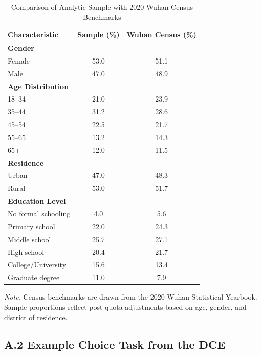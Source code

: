 \documentclass[12pt]{article}
\begin{document}
\begin{table}[H]
\centering
\caption{Comparison of Analytic Sample with 2020 Wuhan Census Benchmarks}
\label{tab:census_compare_A1}
\begin{tabular}{p{5cm}cc}
\toprule
\textbf{Characteristic} & \textbf{Sample (\%)} & \textbf{Wuhan Census (\%)} \\
\midrule
\textbf{Gender} & & \\
Female & 53.0 & 51.1 \\
Male   & 47.0 & 48.9 \\
\addlinespace

\textbf{Age Distribution} & & \\
18--34 & 21.0 & 23.9 \\
35--44 & 31.2 & 28.6 \\
45--54 & 22.5 & 21.7 \\
55--65 & 13.2 & 14.3 \\
65+    & 12.0 & 11.5 \\
\addlinespace

\textbf{Residence} & & \\
Urban & 47.0 & 48.3 \\
Rural & 53.0 & 51.7 \\
\addlinespace

\textbf{Education Level} & & \\
No formal schooling & 4.0  & 5.6 \\
Primary school      & 22.0 & 24.3 \\
Middle school       & 25.7 & 27.1 \\
High school         & 20.4 & 21.7 \\
College/University  & 15.6 & 13.4 \\
Graduate degree     & 11.0 & 7.9 \\
\bottomrule
\end{tabular}

\begin{flushleft}
\footnotesize
\textit{Note.} Census benchmarks are drawn from the 2020 Wuhan Statistical Yearbook. 
Sample proportions reflect post-quota adjustments based on age, gender, and district 
of residence.
\end{flushleft}

\end{table}


\subsection*{A.2 Example Choice Task from the DCE}
\end{document}
